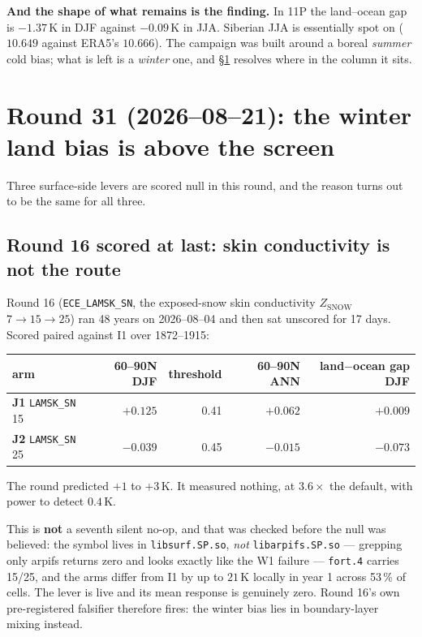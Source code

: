 \documentclass[10pt]{article}
\begin{document}
\textbf{And the shape of what remains is the finding.} In 11P the land--ocean gap is
$-1.37$\,K in DJF against $-0.09$\,K in JJA. Siberian JJA is essentially spot on
($10.649$ against ERA5's $10.666$). The campaign was built around a boreal \emph{summer}
cold bias; what is left is a \emph{winter} one, and \S\ref{sec:round31} resolves where in
the column it sits.

\section{Round 31 (2026--08--21): the winter land bias is above the screen}\label{sec:round31}

Three surface-side levers are scored null in this round, and the reason turns out to be
the same for all three.

\subsection{Round 16 scored at last: skin conductivity is not the route}\label{sub:r31lamsk}

Round 16 (\texttt{ECE\_LAMSK\_SN}, the exposed-snow skin
conductivity $Z_{\text{SNOW}}$ $7\to15\to25$) ran 48 years on 2026--08--04 and then sat
unscored for 17 days. Scored paired against I1 over 1872--1915:

\begin{center}\small
\begin{tabular}{lrrrr}
\toprule
arm & 60--90N DJF & threshold & 60--90N ANN & land$-$ocean gap DJF \\
\midrule
\textbf{J1} \texttt{LAMSK\_SN} 15 & $+0.125$ & 0.41 & $+0.062$ & $+0.009$ \\
\textbf{J2} \texttt{LAMSK\_SN} 25 & $-0.039$ & 0.45 & $-0.015$ & $-0.073$ \\
\bottomrule
\end{tabular}
\end{center}

The round predicted $+1$ to $+3$\,K. It measured nothing, at $3.6\times$ the default, with
power to detect $0.4$\,K.

This is \textbf{not} a seventh silent no-op, and that was checked before the null was
believed: the symbol lives in \texttt{libsurf.SP.so}, \emph{not} \texttt{libarpifs.SP.so}
--- grepping only arpifs returns zero and looks exactly like the W1 failure ---
\texttt{fort.4} carries 15/25, and the arms differ from I1 by up to $21$\,K locally in
year 1 across 53\,\% of cells. The lever is live and its mean response is genuinely zero.
Round 16's own pre-registered falsifier therefore fires: the winter bias lies in
boundary-layer mixing instead.
\end{document}
